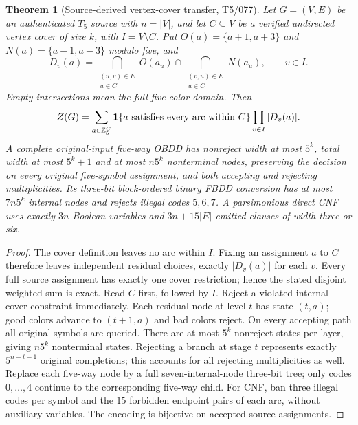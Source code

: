 \documentclass[11pt]{article}
\newtheorem{theorem}{Theorem}
\begin{document}
\begin{theorem}[Source-derived vertex-cover transfer, T5/077]
Let $G=(V,E)$ be an authenticated $T_5$ source with $n=|V|$,
and let $C\subseteq V$ be a \emph{verified} undirected vertex cover of
size $k$, with $I=V\setminus C$.
Put $O(a)=\{a+1,a+3\}$ and $N(a)=\{a-1,a-3\}$ modulo five, and
\[
D_v(a)=
\bigcap_{\substack{(u,v)\in E\\u\in C}}O(a_u)
\cap
\bigcap_{\substack{(v,u)\in E\\u\in C}}N(a_u),
\qquad v\in I.
\]
Empty intersections mean the full five-color domain. Then
\[
Z(G)=\sum_{a\in\mathbb Z_5^C}
 {\bf1}\{a\text{ satisfies every arc within }C\}
 \prod_{v\in I}|D_v(a)|.
\]
A complete original-input five-way OBDD has nonreject width at most
$5^k$, total width at most $5^k+1$ and at most $n5^k$
nonterminal nodes, preserving the decision on \emph{every} original
five-symbol assignment, and both accepting and rejecting multiplicities.
Its three-bit block-ordered binary FBDD conversion has at most
$7n5^k$ internal nodes and rejects illegal codes $5,6,7$.
A parsimonious direct CNF uses exactly $3n$ Boolean variables and
$3n+15|E|$ emitted clauses of width three or six.
\end{theorem}
\begin{proof}
The cover definition leaves no arc within $I$.
Fixing an assignment $a$ to $C$ therefore leaves independent
residual choices, exactly $|D_v(a)|$ for each $v$.
Every full source assignment has exactly one cover restriction;
hence the stated disjoint weighted sum is exact.
Read $C$ first, followed by $I$. Reject a violated internal
cover constraint immediately. Each residual node at level $t$
has state $(t,a)$; good colors advance to $(t+1,a)$ and bad
colors reject. On every accepting path all original symbols are
queried. There are at most $5^k$ nonreject states per layer,
giving $n5^k$ nonterminal states. Rejecting a branch at stage
$t$ represents exactly $5^{n-t-1}$ original completions; this
accounts for all rejecting multiplicities as well.
Replace each five-way node by a full seven-internal-node
three-bit tree; only codes $0,\ldots,4$ continue to the
corresponding five-way child. For CNF, ban three illegal codes
per symbol and the $15$ forbidden endpoint pairs of each
arc, without auxiliary variables. The encoding is bijective
on accepted source assignments.
\end{proof}
\end{document}
